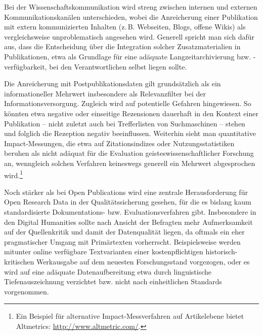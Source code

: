 \documentclass[a4paper,
fontsize=11pt,
oneside,
numbers=noperiodatend,
parskip=half-,
bibliography=totoc,
final
]{scrartcl}
\begin{document}
Bei der Wissenschaftskommunikation wird streng zwischen internen und
externen Kommunikationskanälen unterschieden, wobei die Anreicherung
einer Publikation mit extern kommunizierten Inhalten (z.\,B. Webseiten,
Blogs, offene Wikis) als vergleichsweise unproblematisch angesehen wird.
Generell spricht man sich dafür aus, dass die Entscheidung über die
Integration solcher Zusatzmaterialien in Publikationen, etwa als
Grundlage für eine adäquate Langzeitarchivierung bzw. -verfügbarkeit,
bei den Verantwortlichen selbst liegen sollte.

Die Anreicherung mit Postpublikationsdaten gilt grundsätzlich als ein
informationeller Mehrwert insbesondere als Relevanzfilter bei der
Informationsversorgung. Zugleich wird auf potentielle Gefahren
hingewiesen. So könnten etwa negative oder einseitige Rezensionen
dauerhaft in den Kontext einer Publikation -- nicht zuletzt auch bei
Trefferlisten von Suchmaschinen -- stehen und folglich die Rezeption
negativ beeinflussen. Weiterhin sieht man quantitative Impact-Messungen,
die etwa auf Zitationsindizes oder Nutzungsstatistiken beruhen als nicht
adäquat für die Evaluation geisteswissenschaftlicher Forschung an,
wenngleich solchen Verfahren keineswegs generell ein Mehrwert
abgesprochen wird.\footnote{Ein Beispiel für alternative
  Impact-Messverfahren auf Artikelebene bietet Altmetrics:
  \url{http://www.altmetric.com/}.}

Noch stärker als bei Open Publications wird eine zentrale
Herausforderung für Open Research Data in der Qualitätssicherung
gesehen, für die es bislang kaum standardisierte Dokumentations- bzw.
Evaluationsverfahren gibt. Insbesondere in den Digital Humanities sollte
nach Ansicht der Befragten mehr Aufmerksamkeit auf der Quellenkritik und
damit der Datenqualität liegen, da oftmals ein eher pragmatischer Umgang
mit Primärtexten vorherrscht. Beispielsweise werden mitunter online
verfügbare Textvarianten einer kostenpflichtigen historisch-kritischen
Werkausgabe auf dem neuesten Forschungsstand vorgezogen, oder es wird
auf eine adäquate Datenaufbereitung etwa durch linguistische
Tiefenauszeichnung verzichtet bzw. nicht nach einheitlichen Standards
vorgenommen.
\end{document}
